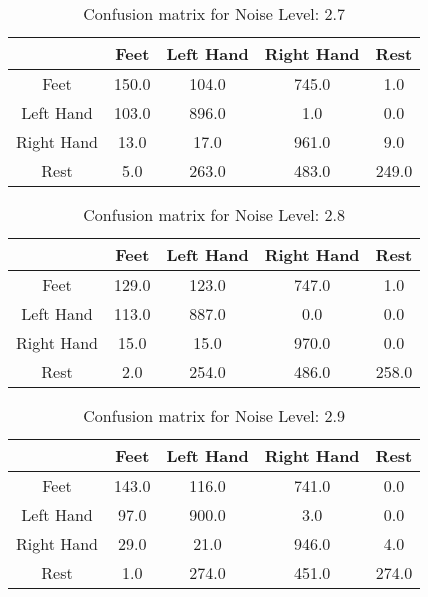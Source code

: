 \begin{table}[!htbp]
    \centering
    \begin{tabular}{|c||c|c|c|c|}
        \hline
		 & Feet & Left Hand & Right Hand & Rest \\
        \hline
        \hline
        Feet & 150.0 & 104.0 & 745.0 & 1.0 \\
        \hline
        Left Hand & 103.0 & 896.0 & 1.0 & 0.0 \\
        \hline
        Right Hand & 13.0 & 17.0 & 961.0 & 9.0 \\
        \hline
        Rest & 5.0 & 263.0 & 483.0 & 249.0 \\
        \hline
    \end{tabular}
    \caption{Confusion matrix for Noise Level: 2.7}
\end{table}

\begin{table}[!htbp]
    \centering
    \begin{tabular}{|c||c|c|c|c|}
        \hline
		 & Feet & Left Hand & Right Hand & Rest \\
        \hline
        \hline
        Feet & 129.0 & 123.0 & 747.0 & 1.0 \\
        \hline
        Left Hand & 113.0 & 887.0 & 0.0 & 0.0 \\
        \hline
        Right Hand & 15.0 & 15.0 & 970.0 & 0.0 \\
        \hline
        Rest & 2.0 & 254.0 & 486.0 & 258.0 \\
        \hline
    \end{tabular}
    \caption{Confusion matrix for Noise Level: 2.8}
\end{table}

\begin{table}[!htbp]
    \centering
    \begin{tabular}{|c||c|c|c|c|}
        \hline
		 & Feet & Left Hand & Right Hand & Rest \\
        \hline
        \hline
        Feet & 143.0 & 116.0 & 741.0 & 0.0 \\
        \hline
        Left Hand & 97.0 & 900.0 & 3.0 & 0.0 \\
        \hline
        Right Hand & 29.0 & 21.0 & 946.0 & 4.0 \\
        \hline
        Rest & 1.0 & 274.0 & 451.0 & 274.0 \\
        \hline
    \end{tabular}
    \caption{Confusion matrix for Noise Level: 2.9}
\end{table}

